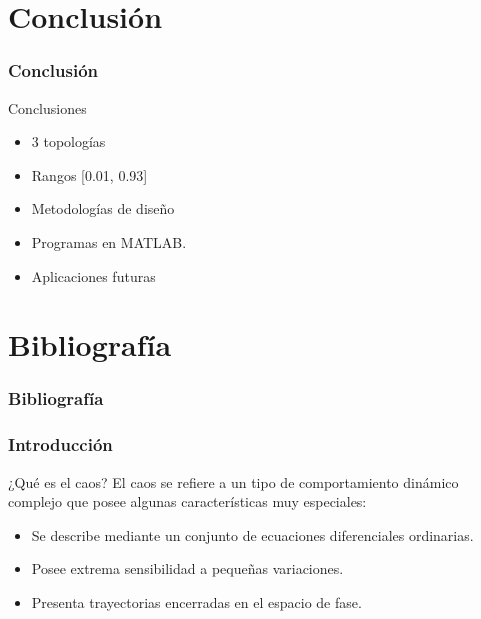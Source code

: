 \documentclass[10pt]{beamer}
\begin{document}
	\section{Conclusión}
	\begin{frame}
		\frametitle{Conclusión}
		\begin{block}{Conclusiones}
			\begin{itemize}
				\item 3 topologías
				\item Rangos [0.01, 0.93]
				\item Metodologías de diseño
				\item Programas en MATLAB.
				\item Aplicaciones futuras
			\end{itemize}
		\end{block}
	\end{frame}	
	
	
	
	
	
	
	
	
	
	\section{Bibliografía}
	\begin{frame}[t, allowframebreaks]
		\frametitle{Bibliografía}
		\nocite{*}
		
		
	\end{frame}
	
	\begin{frame}
		\frametitle{Introducción}
		\begin{block}{¿Qué es el caos?}
		\justifying
			El caos se refiere a un tipo de comportamiento dinámico complejo que posee algunas características muy especiales:
			\begin{itemize}
				\item Se describe mediante un conjunto de ecuaciones diferenciales ordinarias.
				\item Posee extrema sensibilidad a pequeñas variaciones.
				\item Presenta trayectorias encerradas en el espacio de fase.
			\end{itemize}
		\end{block}
	\end{frame}	
	
\end{document}
